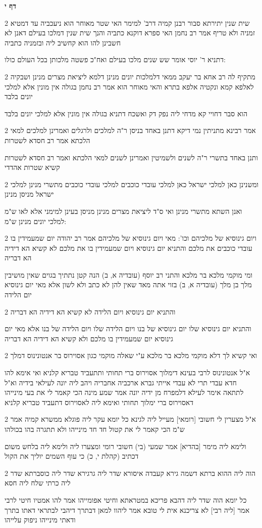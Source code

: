 \documentclass[12pt, openany]{book}
\newcommand{\sethebfont}{
\fontsize{10.5pt}{21.0pt} \selectfont
}
\newcommand{\twocol}[1]{
	{\sethebfont \begin{multicols}{2}
			#1
	\end{multicols}}	
}
\newcommand{\sectname}{}
\newcommand{\newsection}[1]{
	\addcontentsline{toc}{section}{#1}
	\renewcommand{\sectname}{#1}	
	\vspace{-\baselineskip}
	\begin{center}
		\textbf{%
\fontsize{16pt}{16pt}\selectfont
			#1}
	\end{center}
	\vspace{-\baselineskip}
	\nopagebreak
}
\begin{document}
\newsection{דף י}
\twocol{שית שנין יתירתא סבור רבנן קמיה דרב' למימר האי שטר מאוחר הוא ניעכביה עד דמטיא זמניה ולא טריף אמר רב נחמן האי ספרא דוקנא כתביה והנך שית שנין דמלכו בעילם דאנן לא חשבינן להו הוא קחשיב ליה ובזמניה כתביה
\par דתניא ר' יוסי אומר שש שנים מלכו בעילם ואח"כ פשטה מלכותן בכל העולם כולו:}
\twocol{מתקיף לה רב אחא בר יעקב ממאי דלמלכות יונים מנינן דלמא ליציאת מצרים מנינן ושבקיה לאלפא קמא ונקטיה אלפא בתרא והאי מאוחר הוא אמר רב נחמן בגולה אין מונין אלא למלכי יונים בלבד
\par הוא סבר דחויי קא מדחי ליה נפק דק ואשכח דתניא בגולה אין מונין אלא למלכי יונים בלבד}
\twocol{אמר רבינא מתניתין נמי דיקא דתנן באחד בניסן ר"ה למלכים ולרגלים ואמרינן למלכים למאי הלכתא אמר רב חסדא לשטרות
\par ותנן באחד בתשרי ר"ה לשנים ולשמיטין ואמרינן לשנים למאי הלכתא ואמר רב חסדא לשטרות קשיא שטרות אהדדי}
\twocol{ומשנינן כאן למלכי ישראל כאן למלכי עובדי כוכבים למלכי עובדי כוכבים מתשרי מנינן למלכי ישראל מניסן מנינן
\par ואנן השתא מתשרי מנינן ואי ס"ד ליציאת מצרים מנינן מניסן בעינן למימני אלא לאו ש"מ למלכי יונים מנינן ש"מ:}
\twocol{ויום גינוסיא של מלכיהם וכו': מאי ויום גינוסיא של מלכיהם אמר רב יהודה יום שמעמידין בו עובדי כוכבים את מלכם והתניא יום גינוסיא ויום שמעמידין בו את מלכם לא קשיא הא דידיה הא דבריה
\par ומי מוקמי מלכא בר מלכא והתני רב יוסף (עובדיה א, ב) הנה קטן נתתיך בגוים שאין מושיבין מלך בן מלך (עובדיה א, ב) בזוי אתה מאד שאין להן לא כתב ולא לשון אלא מאי יום גינוסיא יום הלידה}
\twocol{והתניא יום גינוסיא ויום הלידה לא קשיא הא דידיה הא דבריה
\par והתניא יום גינוסיא שלו יום גינוסיא של בנו ויום הלידה שלו ויום הלידה של בנו אלא מאי יום גינוסיא יום שמעמידין בו מלכם ולא קשיא הא דידיה הא דבריה}
\twocol{ואי קשיא לך דלא מוקמי מלכא בר מלכא ע"י שאלה מוקמי כגון אסוירוס בר אנטונינוס דמלך
\par א"ל אנטונינוס לרבי בעינא דימלוך אסוירוס ברי תחותי ותתעביד טבריא קלניא ואי אימא להו חדא עבדי תרי לא עבדי אייתי גברא ארכביה אחבריה ויהב ליה יונה לעילאי בידיה וא"ל לתתאה אימר לעילא דלמפרח מן ידיה יונה אמר שמע מינה הכי קאמר לי את בעי מינייהו דאסוירוס ברי ימלוך תחותי ואימא ליה לאסוירוס דתעביד טבריא קלניא}
\twocol{א"ל מצערין לי חשובי [רומאי] מעייל ליה לגינא כל יומא עקר ליה פוגלא ממשרא קמיה אמר ש"מ הכי קאמר לי את קטול חד חד מינייהו ולא תתגרה בהו בכולהו
\par ולימא ליה מימר [בהדיא] אמר שמעי (בי) חשובי רומי ומצערו ליה ולימא ליה בלחש משום דכתיב (קהלת י, כ) כי עוף השמים יוליך את הקול}
\twocol{הוה ליה ההוא ברתא דשמה גירא קעבדה איסורא שדר ליה גרגירא שדר ליה כוסברתא שדר ליה כרתי שלח ליה חסא
\par כל יומא הוה שדר ליה דהבא פריכא במטראתא וחיטי אפומייהו אמר להו אמטיו חיטי לרבי אמר [ליה רבי] לא צריכנא אית לי טובא אמר ליהוו למאן דבתרך דיהבי לבתראי דאתו בתרך ודאתי מינייהו ניפוק עלייהו}
\end{document}
